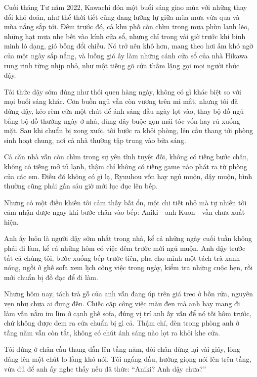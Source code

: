 \documentclass[../main.tex]{subfiles}
\begin{document}



Cuối tháng Tư năm 2022, Kawachi đón một buổi sáng giao mùa với những thay đổi khó đoán, như thể thời tiết cũng đang lưỡng lự giữa mùa mưa vừa qua và mùa nắng sắp tới. Đêm trước đó, cả khu phố còn chìm trong mưa phùn lạnh lẽo, những hạt mưa nhẹ bết vào kính cửa sổ, nhưng chỉ trong vài giờ trước khi bình minh ló dạng, gió bỗng đổi chiều. Nó trở nên khô hơn, mang theo hơi ấm khó ngờ của một ngày sắp nắng, và luồng gió ấy làm những cánh cửa sổ của nhà Hikawa rung rinh từng nhịp nhỏ, như một tiếng gõ cửa thầm lặng gọi mọi người thức dậy.

Tôi thức dậy sớm đúng như thói quen hàng ngày, không có gì khác biệt so với mọi buổi sáng khác. Cơn buồn ngủ vẫn còn vương trên mi mắt, nhưng tôi đã đứng dậy, kéo rèm cửa một chút để ánh sáng đầu ngày lọt vào, thay bộ đồ ngủ bằng bộ đồ thường ngày ở nhà, dùng dây buộc gọn mái tóc vốn hay rủ xuống mặt. Sau khi chuẩn bị xong xuôi, tôi bước ra khỏi phòng, lên cầu thang tới phòng sinh hoạt chung, nơi cả nhà thường tập trung vào bữa sáng.

Cả căn nhà vẫn còn chìm trong sự yên tĩnh tuyệt đối, không có tiếng bước chân, không có tiếng mở tủ lạnh, thậm chí không có tiếng game nào phát ra từ phòng của các em. Điều đó không có gì lạ, Ryuuhou vốn hay ngủ muộn, dậy muộn, bình thường cũng phải gần sáu giờ mới lục đục lên bếp. 

Nhưng có một điều khiến tôi cảm thấy bất ổn, một chi tiết nhỏ mà tự nhiên tôi cảm nhận được ngay khi bước chân vào bếp: Aniki - anh Kuon - vẫn chưa xuất hiện.

Anh ấy luôn là người dậy sớm nhất trong nhà, kể cả những ngày cuối tuần không phải đi làm, kể cả những hôm có việc đêm trước mới ngủ muộn. Anh dậy trước tất cả chúng tôi, bước xuống bếp trước tiên, pha cho mình một tách trà xanh nóng, ngồi ở ghế sofa xem lịch công việc trong ngày, kiểm tra những cuộc hẹn, rồi mới chuẩn bị đồ đạc để đi làm.

Nhưng hôm nay, tách trà gỗ của anh vẫn đang úp trên giá treo ở bồn rửa, nguyên vẹn như chưa ai đụng đến. Chiếc cặp công việc màu đen mà anh hay mang đi làm vẫn nằm im lìm ở cạnh ghế sofa, đúng vị trí anh ấy vẫn để nó tối hôm trước, chứ không được đem ra cửa chuẩn bị gì cả. Thậm chí, đèn trong phòng anh ở tầng năm vẫn còn tắt, không có chút ánh sáng nào lọt ra khỏi khe cửa.

Tôi đứng ở chân cầu thang dẫn lên tầng năm, đôi chân dừng lại vài giây, lòng dâng lên một chút lo lắng khó nói. Tôi ngẩng đầu, hướng giọng nói lên trên tầng, vừa đủ để anh ấy nghe thấy nếu đã thức: ``Aniki? Anh dậy chưa?''
\end{document}
